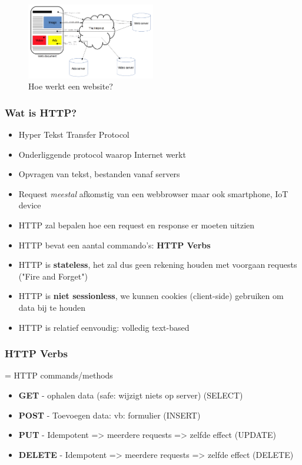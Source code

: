 \documentclass{article}
\newcommand{\bold}[1]{\textbf{#1}}
\begin{document}
\begin{figure}[H]
    \centering
    \includegraphics[width=0.5\textwidth]{http-website.png}
    \caption{Hoe werkt een website?}
\end{figure}


\subsubsection{Wat is HTTP?}
\begin{itemize}
    \item Hyper Tekst Transfer Protocol
    \item Onderliggende protocol waarop Internet werkt
    \item Opvragen van tekst, bestanden vanaf servers
    \item Request \textit{meestal} afkomstig van een webbrowser maar ook smartphone, IoT device
    \item HTTP zal bepalen hoe een request en response er moeten uitzien
    \item HTTP bevat een aantal commando’s: \bold{HTTP Verbs}
    \item HTTP is \bold{stateless}, het zal dus geen rekening houden met voorgaan requests ("Fire and Forget")
    \item HTTP is \bold{niet sessionless}, we kunnen cookies (client-side) gebruiken om data bij te houden
    \item HTTP is relatief eenvoudig: volledig text-based
\end{itemize}

\subsubsection{HTTP Verbs}
= HTTP commands/methods

\begin{itemize}
    \item \bold{GET} - ophalen data (safe: wijzigt niets op server) (SELECT)
    \item \bold{POST} - Toevoegen data: vb: formulier (INSERT)
    \item \bold{PUT} - Idempotent => meerdere requests => zelfde effect (UPDATE)
    \item \bold{DELETE} - Idempotent => meerdere requests => zelfde effect (DELETE)
\end{itemize}
\end{document}
